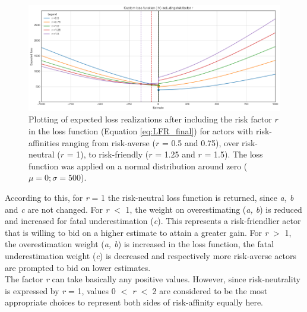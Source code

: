 		\begin{figure}[h]
			\centering
			\includegraphics[width=1\textwidth]{Figures/LFR_normal.png}
			\caption{Plotting of expected loss realizations after including the risk factor $r$ in the loss function (Equation \ref{eq:LFR_final}) for actors with risk-affinities ranging from risk-averse ($r$ = 0.5 and 0.75), over risk-neutral ($r$ = 1), to risk-friendly ($r$ = 1.25 and $r$ = 1.5). The loss function was applied on a normal distribution around zero ($\mu=0; \sigma=500$).}\label{fig:LFR_normal} 
		\end{figure}
		According to this, for \textit{r} = 1 the risk-neutral loss function is returned, since \textit{a, b} and \textit{c} are not changed. For \textit{r} $<$ 1, the weight on overestimating (\textit{a, b}) is reduced and increased for fatal underestimation (\textit{c}). This represents a risk-friendlier actor that is willing to bid on a higher estimate to attain a greater gain. For \textit{r} $>$ 1, the overestimation weight (\textit{a, b}) is increased in the loss function, the fatal underestimation weight (\textit{c}) is decreased and respectively more risk-averse actors are prompted to bid on lower estimates.\\		
		The factor \textit{r} can take basically any positive values. However, since risk-neutrality is expressed by \textit{r} = 1, values 0 $<$ \textit{r} $<$ 2 are considered to be the most appropriate choices to represent both sides of risk-affinity equally here.		
		
